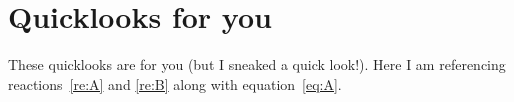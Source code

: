 \documentclass{fsthesis}
\begin{document}
\section{Quicklooks for you}
These quicklooks are for you (but I sneaked a quick look!). Here I am referencing reactions~\ref{re:A} and \ref{re:B} along with equation~\ref{eq:A}.


\printglossary[type=\acronymtype]



\end{document}
